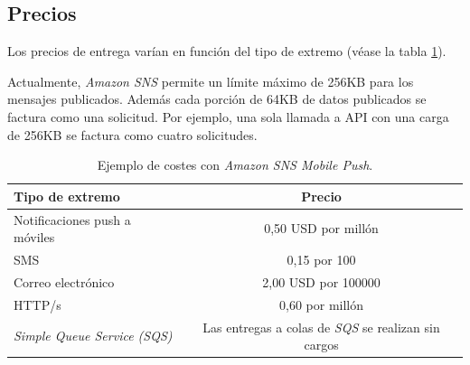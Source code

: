 \documentclass{article}
\begin{document}
	
\subsection{Precios}
	Los precios de entrega varían en función del tipo de extremo (véase la tabla \ref{tab:PrizeSNS}).
	
	Actualmente, \emph{Amazon SNS} permite un límite máximo de 256KB para los mensajes publicados. Además cada porción de 64KB de datos publicados se factura como una solicitud. Por ejemplo, una sola llamada a API con una carga de 256KB se factura como cuatro solicitudes.
	
\begin{table}[h]
	\begin{center}
		\caption{Ejemplo de costes con \emph{Amazon SNS Mobile Push}.}
		\begin{tabular}{|l|c|}
\hline
\textbf{Tipo de extremo} & \textbf{Precio} \\ \hline
Notificaciones push a móviles & 0,50 USD por millón \\ \hline
SMS & 0,15 por 100 \\ \hline
Correo electrónico & 2,00 USD por 100000 \\ \hline
HTTP/s & 0,60 por millón \\ \hline
\emph{Simple Queue Service (SQS)} & Las entregas a colas de \emph{SQS}  se realizan sin cargos \\ \hline
		\end{tabular}
		\label{tab:PrizeSNS}
	\end{center}
\end{table}



\clearpage
{\setlength{\parskip}{0mm} \listoffigures} %

{\setlength{\parskip}{0mm} \listoftables}

\clearpage
\end{document}
